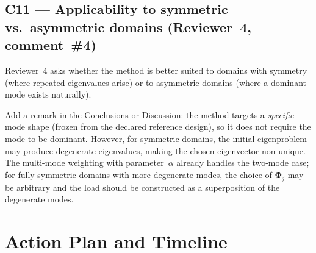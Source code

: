 \documentclass[12pt,a4paper]{article}
\begin{document}
\subsection{C11 — Applicability to symmetric vs.\ asymmetric domains (Reviewer~4, comment~\#4)}

Reviewer~4 asks whether the method is better suited to domains with symmetry
(where repeated eigenvalues arise) or to asymmetric domains (where a dominant
mode exists naturally).

Add a remark in the Conclusions or Discussion: the method targets a
\emph{specific} mode shape (frozen from the declared reference design), so it
does not require the mode to be dominant. However, for symmetric domains, the
initial eigenproblem may produce degenerate eigenvalues, making the chosen
eigenvector non-unique. The multi-mode weighting with parameter~$\alpha$
already handles the two-mode case; for fully symmetric domains with more
degenerate modes, the choice of $\boldsymbol{\Phi}_j$ may be arbitrary and
the load should be constructed as a superposition of the degenerate modes.

\newpage
\section{Action Plan and Timeline}
\end{document}
